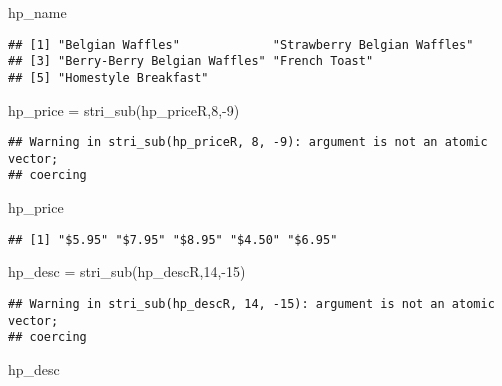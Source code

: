 \documentclass[
]{article}
\newenvironment{Shaded}{\begin{snugshade}}{\end{snugshade}}
\newcommand{\DecValTok}[1]{\textcolor[rgb]{0.00,0.00,0.81}{#1}}
\newcommand{\FunctionTok}[1]{\textcolor[rgb]{0.00,0.00,0.00}{#1}}
\newcommand{\NormalTok}[1]{#1}
\newcommand{\OtherTok}[1]{\textcolor[rgb]{0.56,0.35,0.01}{#1}}
\newcommand{\SpecialCharTok}[1]{\textcolor[rgb]{0.00,0.00,0.00}{#1}}
\begin{document}
\begin{Shaded}
\begin{Highlighting}[]
\NormalTok{hp\_name}
\end{Highlighting}
\end{Shaded}

\begin{verbatim}
## [1] "Belgian Waffles"             "Strawberry Belgian Waffles" 
## [3] "Berry-Berry Belgian Waffles" "French Toast"               
## [5] "Homestyle Breakfast"
\end{verbatim}

\begin{Shaded}
\begin{Highlighting}[]
\NormalTok{hp\_price }\OtherTok{=} \FunctionTok{stri\_sub}\NormalTok{(hp\_priceR,}\DecValTok{8}\NormalTok{,}\SpecialCharTok{{-}}\DecValTok{9}\NormalTok{)}
\end{Highlighting}
\end{Shaded}

\begin{verbatim}
## Warning in stri_sub(hp_priceR, 8, -9): argument is not an atomic vector;
## coercing
\end{verbatim}

\begin{Shaded}
\begin{Highlighting}[]
\NormalTok{hp\_price}
\end{Highlighting}
\end{Shaded}

\begin{verbatim}
## [1] "$5.95" "$7.95" "$8.95" "$4.50" "$6.95"
\end{verbatim}

\begin{Shaded}
\begin{Highlighting}[]
\NormalTok{hp\_desc }\OtherTok{=} \FunctionTok{stri\_sub}\NormalTok{(hp\_descR,}\DecValTok{14}\NormalTok{,}\SpecialCharTok{{-}}\DecValTok{15}\NormalTok{)}
\end{Highlighting}
\end{Shaded}

\begin{verbatim}
## Warning in stri_sub(hp_descR, 14, -15): argument is not an atomic vector;
## coercing
\end{verbatim}

\begin{Shaded}
\begin{Highlighting}[]
\NormalTok{hp\_desc}
\end{Highlighting}
\end{Shaded}
\end{document}

